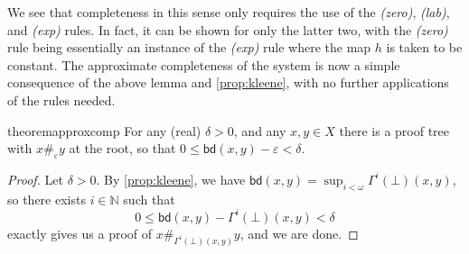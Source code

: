 \documentclass[a4paper,UKenglish,cleveref,autoref,thm-restate]{lipics-v2021}
\newenvironment{proofappendix}[1]{\begin{proof}}{\end{proof}}
\newcommand{\bd}{\mathsf{bd}}
\newcommand{\apart}[1]{\mathrel{\#_{#1}}}
\begin{document}
We see that completeness in this sense only requires the use of the \emph{(zero)}, \emph{(lab)}, and \emph{(exp)} rules. In fact, it can be shown for only the latter two, with the \emph{(zero)} rule being essentially an instance of the \emph{(exp)} rule where the map \(h\) is taken to be constant. The approximate completeness of the system is now a simple consequence of the above lemma and \cref{prop:kleene}, with no further applications of the rules needed.

\begin{restatable}{theorem}{approxcomp}\label{thm:approxcomp}
	For any (real) \(\delta > 0\), and any \(x,y \in X\) there is a proof tree with \(x \apart{\varepsilon} y\) at the root, so that \(0 \leq \bd(x,y) - \varepsilon < \delta\).
\end{restatable}

\begin{proofappendix}{approxcomp}
	Let \(\delta > 0\). By \cref{prop:kleene}, we have \(\bd(x,y) = \sup_{i < \omega} \Gamma^i(\bot)(x,y)\), so there exists \(i \in \mathbb{N}\) such that
	\[
		0 \leq \bd(x,y) - \Gamma^i(\bot)(x,y) < \delta
	\]
	 exactly gives us a proof of \(x \apart{\Gamma^i(\bot)(x,y)} y\), and we are done.
\end{proofappendix}



\end{document}
